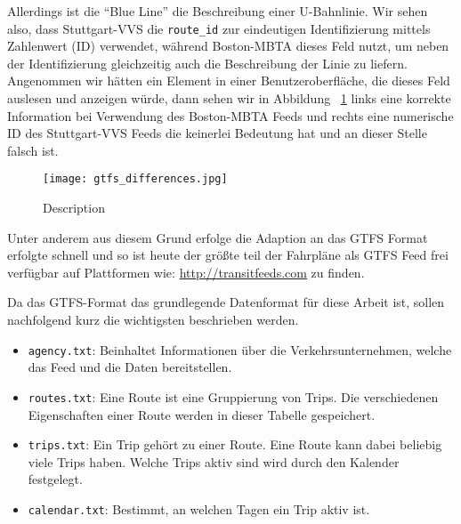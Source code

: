 \begin{newpage}

    Allerdings ist die "`Blue Line"' die Beschreibung einer U-Bahnlinie\parencite{wiki_blue_line}. Wir sehen also, dass Stuttgart-VVS die \texttt{route\_id} zur eindeutigen Identifizierung mittels Zahlenwert (ID) verwendet, während Boston-MBTA dieses Feld nutzt, um neben der Identifizierung gleichzeitig auch die Beschreibung der Linie zu liefern. Angenommen wir hätten ein Element in einer Benutzeroberfläche, die dieses Feld auslesen und anzeigen würde, dann sehen wir in Abbildung ~\ref{fig:gtfs_differences} links eine korrekte Information bei Verwendung des Boston-MBTA Feeds und rechts eine numerische ID des Stuttgart-VVS Feeds die keinerlei Bedeutung hat und an dieser Stelle falsch ist.

    \begin{figure}[htbp]
      \begin{center}
        \texttt{[image: gtfs\_differences.jpg]}
        \caption{Description}
        \label{fig:gtfs_differences}
      \end{center}
    \end{figure}
    
    
    
		Unter anderem aus diesem Grund erfolge die Adaption an das GTFS Format erfolgte schnell und so ist heute der größte teil der Fahrpläne als GTFS Feed frei verfügbar auf Plattformen wie: \url{http://transitfeeds.com} zu finden. 

		Da das GTFS-Format das grundlegende Datenformat für diese Arbeit ist, sollen nachfolgend kurz die wichtigsten beschrieben werden.

		\begin{itemize}
			\item \texttt{agency.txt}: Beinhaltet Informationen über die Verkehrsunternehmen, welche das Feed und die Daten bereitstellen.

			\item \texttt{routes.txt}: Eine Route ist eine Gruppierung von Trips. Die verschiedenen Eigenschaften einer Route werden in dieser Tabelle gespeichert.

			\item \texttt{trips.txt}: Ein Trip gehört zu einer Route. Eine Route kann dabei beliebig viele Trips haben. Welche Trips aktiv sind wird durch den Kalender festgelegt.

			\item \texttt{calendar.txt}: Bestimmt, an welchen Tagen ein Trip aktiv ist.


\end{itemize}
\end{newpage}
